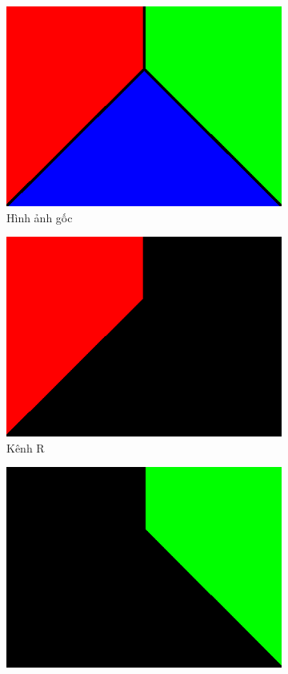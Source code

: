 \documentclass[12pt]{extreport}
\begin{document}
\begin{figure}[H]
    \centering
    \begin{subfigure}[H]{\textwidth}
        \centering
        \includegraphics[width=0.3\linewidth]{figure24.png}
        \caption{Hình ảnh gốc}
    \end{subfigure}
    \begin{subfigure}[H]{0.3\textwidth}
        \centering
        \includegraphics[width=\linewidth]{figure25.png}
        \caption{Kênh R}
    \end{subfigure}
    \begin{subfigure}[H]{0.3\textwidth}
        \centering
        \includegraphics[width=\linewidth]{figure26.png}

\end{subfigure}
\end{figure}
\end{document}
